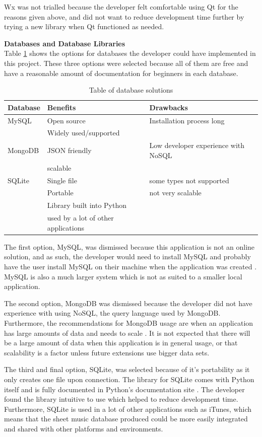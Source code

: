 Wx was not trialled because the developer felt comfortable using Qt for the reasons given above, and did not want to reduce development time further by trying a new library when Qt functioned as needed.

\textbf{Databases and Database Libraries}\\
Table \ref{table:databases} shows the options for databases the developer could have implemented in this project. These three options were selected because all of them are free and have a reasonable amount of documentation for beginners in each database.

\begin{table}[H]
\centering
\begin{tabular}{| l | l | l |} \hline
  {Database} & {Benefits} & {Drawbacks} \\ \hline
  MySQL & Open source & Installation process long \\
  & Widely used/supported & \\ \hline
  MongoDB & JSON friendly & Low developer experience with NoSQL \\ 
  & scalable & \\ \hline
  SQLite & Single file & some types not supported \\
  & Portable & not very scalable \\
  & Library built into Python & \\
  & used by a lot of other applications & \\ \hline
  
  
\end{tabular}
\caption{Table of database solutions}
\label{table:databases}
\end{table}

The first option, MySQL, was dismissed because this application is not an online solution, and as such, the developer would need to install MySQL and probably have the user install MySQL on their machine when the application was created \parencite{mysql}. MySQL is also a much larger system which is not as suited to a smaller local application.

The second option, MongoDB was dismissed because the developer did not have experience with using NoSQL, the query language used by MongoDB. Furthermore, the recommendations for MongoDB usage are when an application has large amounts of data and needs to scale \parencite{mongod}. It is not expected that there will be a large amount of data when this application is in general usage, or that scalability is a factor unless future extensions use bigger data sets.

The third and final option, SQLite, was selected because of it's portability as it only creates one file upon connection. The library for SQLite comes with Python itself and is fully documented in Python's documentation site \parencite{PythonSQLite}. The developer found the library intuitive to use which helped to reduce development time. Furthermore, SQLite is used in a lot of other applications such as iTunes, %
which means that the sheet music database produced could be more easily integrated and shared with other platforms and environments.

